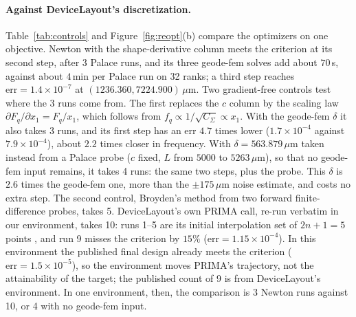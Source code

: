 \documentclass{anvil-paper}
\begin{document}
\paragraph{Against DeviceLayout's discretization.}
Table~\ref{tab:controls} and Figure~\ref{fig:reopt}(b) compare the
optimizers on one objective. Newton
with the shape-derivative column meets the criterion at its second step,
after 3 Palace runs, and its three geode-fem solves add about $70$\,s,
against about $4$\,min per Palace run on 32 ranks; a third step reaches
$\mathrm{err} = 1.4\times10^{-7}$ at $(1236.360, 7224.900)\,\mu$m. Two
gradient-free controls test where the 3 runs come from. The first replaces
the $c$ column by the scaling law $\partial F_q/\partial x_1 = F_q/x_1$,
which follows from $f_q \propto 1/\sqrt{C_\Sigma} \propto x_1$. With the
geode-fem $\delta$ it also takes 3 runs, and its first step has an err
$4.7$ times lower ($1.7\times10^{-4}$ against $7.9\times10^{-4}$), about
$2.2$ times closer in frequency. With $\delta = 563.879\,\mu$m taken
instead from a Palace probe ($c$ fixed, $L$ from $5000$ to
$5263\,\mu$m), so that no geode-fem input remains, it takes 4 runs: the
same two steps, plus the probe. This $\delta$ is $2.6$ times the geode-fem
one, more than the $\pm175\,\mu$m noise estimate, and costs no extra step.
The second control, Broyden's method \citep{broyden1965class} from two
forward finite-difference probes, takes 5. DeviceLayout's own PRIMA call,
re-run verbatim in our environment, takes 10: runs 1--5 are its initial
interpolation set of $2n+1 = 5$ points \citep{powell2009bobyqa}, and run 9 misses the criterion by $15\%$ ($\mathrm{err} =
1.15\times10^{-4}$). In this environment the published final design already
meets the criterion ($\mathrm{err} = 1.5\times10^{-5}$), so the environment
moves PRIMA's trajectory, not the attainability of the target; the
published count of 9 is from DeviceLayout's environment. In one
environment, then, the comparison is 3 Newton runs against 10, or 4 with
no geode-fem input.
\end{document}
